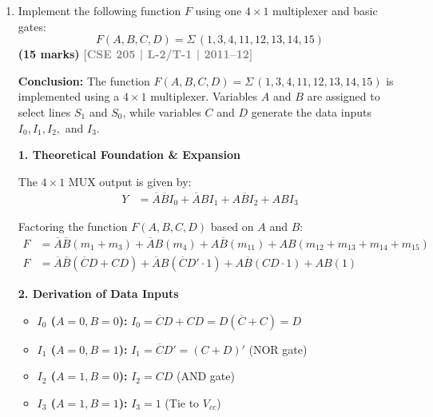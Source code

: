\documentclass[12pt,a3paper]{article}
\newcommand{\yr}[1]{\hfill\textcolor{gray}{\small\textbf{[#1]}}}
\newcommand{\mk}[1]{\textcolor{orange!70!black}{\small\textbf{(#1 marks)}}}
\begin{document}
\begin{enumerate}
\begin{tcolorbox}[enhanced,breakable,ansbox,colback=cD!4,colframe=cD,boxrule=0.8pt,arc=5pt,title={\textbf{Answer}},fonttitle=\bfseries\color{white},colbacktitle=cD]
\end{tcolorbox}

\item Implement the following function $F$ using one $4 \times 1$ multiplexer and basic gates:
\[ F(A,B,C,D) = \Sigma\,(1,3,4,11,12,13,14,15) \]
\mk{15} \yr{CSE 205 | L-2/T-1 | 2011--12}

\begin{tcolorbox}[enhanced,breakable,ansbox,colback=cD!4,colframe=cD,boxrule=0.8pt,arc=5pt,title={\textbf{Answer}},fonttitle=\bfseries\color{white},colbacktitle=cD]

\textbf{Conclusion:} 
The function $F(A,B,C,D) = \Sigma\,(1,3,4,11,12,13,14,15)$ is implemented using a $4 \times 1$ multiplexer. Variables $A$ and $B$ are assigned to select lines $S_1$ and $S_0$, while variables $C$ and $D$ generate the data inputs $I_0, I_1, I_2,$ and $I_3$.

\vspace{1em}
\textbf{\large 1. Theoretical Foundation \& Expansion}

The $4 \times 1$ MUX output is given by:
\begin{align*}
    Y &= \overline{A}\overline{B} I_0 + \overline{A}B I_1 + A\overline{B} I_2 + AB I_3
\end{align*}

Factoring the function $F(A,B,C,D)$ based on $A$ and $B$:
\begin{align*}
    F &= \overline{A}\overline{B}(m_1 + m_3) + \overline{A}B(m_4) + A\overline{B}(m_{11}) + AB(m_{12} + m_{13} + m_{14} + m_{15}) \\
    F &= \overline{A}\overline{B}(\overline{C}D + CD) + \overline{A}B(\overline{C}D' \cdot 1) + A\overline{B}(CD \cdot 1) + AB(1)
\end{align*}

\vspace{1em}
\textbf{\large 2. Derivation of Data Inputs}

\begin{itemize}
    \item \textbf{$I_0$ ($A=0, B=0$):} $I_0 = \overline{C}D + CD = D(\overline{C} + C) = D$
    \item \textbf{$I_1$ ($A=0, B=1$):} $I_1 = \overline{C}D' = (C + D)'$ (NOR gate)
    \item \textbf{$I_2$ ($A=1, B=0$):} $I_2 = CD$ (AND gate)
    \item \textbf{$I_3$ ($A=1, B=1$):} $I_3 = 1$ (Tie to $V_{cc}$)
\end{itemize}


\end{tcolorbox}
\end{enumerate}
\end{document}
